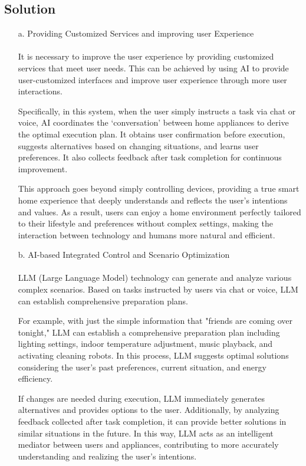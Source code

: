 \documentclass[conference]{IEEEtran}
\begin{document}
\subsection{Solution}
\begin{itemize}
    \item [a.] Providing Customized Services and improving user Experience \\ \\ 
    It is necessary to improve the user experience by providing customized services that meet user needs. This can be achieved by using AI to provide user-customized interfaces and improve user experience through more user interactions.

    \hspace{1em} Specifically, in this system, when the user simply instructs a task via chat or voice, AI coordinates the `conversation' between home appliances to derive the optimal execution plan. It obtains user confirmation before execution, suggests alternatives based on changing situations, and learns user preferences. It also collects feedback after task completion for continuous improvement.
    
    \hspace{1em} This approach goes beyond simply controlling devices, providing a true smart home experience that deeply understands and reflects the user's intentions and values. As a result, users can enjoy a home environment perfectly tailored to their lifestyle and preferences without complex settings, making the interaction between technology and humans more natural and efficient.\\
    
    \item [b.] AI-based Integrated Control and Scenario Optimization \\ \\
    LLM (Large Language Model) technology can generate and analyze various complex scenarios. Based on tasks instructed by users via chat or voice, LLM can establish comprehensive preparation plans.
    
    For example, with just the simple information that "friends are coming over tonight," LLM can establish a comprehensive preparation plan including lighting settings, indoor temperature adjustment, music playback, and activating cleaning robots. In this process, LLM suggests optimal solutions considering the user's past preferences, current situation, and energy efficiency.
    
    \hspace{1em} If changes are needed during execution, LLM immediately generates alternatives and provides options to the user. Additionally, by analyzing feedback collected after task completion, it can provide better solutions in similar situations in the future. In this way, LLM acts as an intelligent mediator between users and appliances, contributing to more accurately understanding and realizing the user's intentions.\\
    

\end{itemize}
\end{document}
